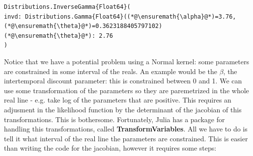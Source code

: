 \documentclass[12pt,a4paper]{article}
\begin{document}
\begin{lstlisting}
Distributions.InverseGamma{Float64}(
invd: Distributions.Gamma{Float64}((*@\ensuremath{\alpha}@*)=3.76, (*@\ensuremath{\theta}@*)=0.3623188405797102)
(*@\ensuremath{\theta}@*): 2.76
)
\end{lstlisting}


Notice that we have a potential problem using a Normal kernel: some parameters are constrained in some interval of the reals. An example would be the $\beta$, the intertemporal discount parameter: this is constrained between 0 and 1. We can use some transformation of the parameters so they are paremetrized in the whole real line - e.g. take log of the parameters that are positive. This requires an adjusment in the likelihood function by the determinant of the jacobian of this transformations. This is bothersome. Fortunately, Julia has a package for handling this transformations, called \textbf{TransformVariables}. All we have to do is tell it what interval of the real line the parameters are constrained. This is easier than writing the code for the jacobian, however it requires some steps:
\end{document}
